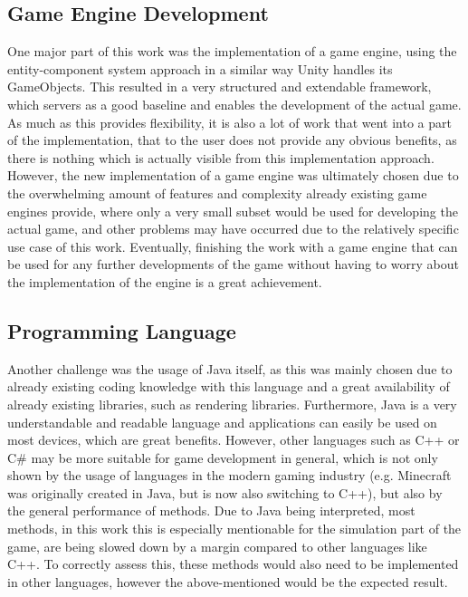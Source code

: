 \subsection{Game Engine Development}\label{subsec:entity-component-system-challenges}
One major part of this work was the implementation of a game engine, using the entity-component system approach in a similar way
Unity handles its GameObjects.
This resulted in a very structured and extendable framework, which servers as a good baseline and enables the development of the actual game.
As much as this provides flexibility, it is also a lot of work that went into a part of the implementation, that to the user
does not provide any obvious benefits, as there is nothing which is actually visible from this implementation approach.
However, the new implementation of a game engine was ultimately chosen due to the overwhelming amount of features and complexity
already existing game engines provide, where only a very small subset would be used for developing the actual game, and other problems
may have occurred due to the relatively specific use case of this work.
Eventually, finishing the work with a game engine that can be used for any further developments of the game without having to worry
about the implementation of the engine is a great achievement.

\subsection{Programming Language}\label{subsec:programming-language}
Another challenge was the usage of Java itself, as this was mainly chosen due to already existing coding knowledge with this
language and a great availability of already existing libraries, such as rendering libraries.
Furthermore, Java is a very understandable and readable language and applications can easily be used on most devices, which are great benefits.
However, other languages such as C++ or C\# may be more suitable for game development in general, which is not only shown by
the usage of languages in the modern gaming industry (e.g. Minecraft was originally created in Java, but is now also switching to C++), but
also by the general performance of methods.
Due to Java being interpreted, most methods, in this work this is especially mentionable for the simulation part of the game, are being slowed down
by a margin compared to other languages like C++.
To correctly assess this, these methods would also need to be implemented in other languages, however the above-mentioned would
be the expected result.